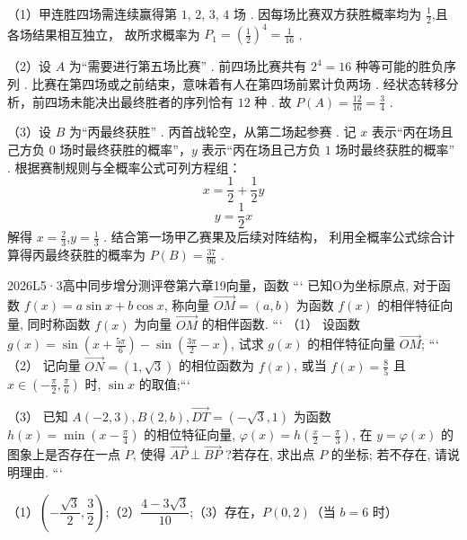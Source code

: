 \documentclass[12pt,UTF-8,a4paper]{ctexart}
\numberwithin{figure}{section}
\theoremstyle{mystyle}
\theoremstyle{mystylekaishu}
\theoremstyle{mystyle}
\numberwithin{xiti}{section}
\begin{document}
\begin{solutions}
（1）甲连胜四场需连续赢得第 $1$, $2$, $3$, $4$ 场 .
因每场比赛双方获胜概率均为 $\displaystyle \frac{1}{2}$,且各场结果相互独立，
故所求概率为 $P_1 = \left(\displaystyle \frac{1}{2}\right)^4 = \displaystyle \frac{1}{16}$ .

（2）设 $A$ 为“需要进行第五场比赛” .
前四场比赛共有 $2^4 = 16$ 种等可能的胜负序列 .
比赛在第四场或之前结束，意味着有人在第四场前累计负两场 .
经状态转移分析，前四场未能决出最终胜者的序列恰有 $12$ 种 .
故 $P(A) = \displaystyle \frac{12}{16} = \displaystyle \frac{3}{4}$ .

（3）设 $B$ 为“丙最终获胜” .
丙首战轮空，从第二场起参赛 .
记 $x$ 表示“丙在场且己方负 $0$ 场时最终获胜的概率”，$y$ 表示“丙在场且己方负 $1$ 场时最终获胜的概率” .
根据赛制规则与全概率公式可列方程组：
$$
x = \displaystyle \frac{1}{2} + \displaystyle \frac{1}{2} y
$$
$$
y = \displaystyle \frac{1}{2} x
$$
解得 $x = \displaystyle \frac{2}{3}$,$y = \displaystyle \frac{1}{3}$ .
结合第一场甲乙赛果及后续对阵结构，
利用全概率公式综合计算得丙最终获胜的概率为 $P(B) = \displaystyle \frac{37}{96}$ .
\end{solutions}


\begin{problem}{2026}{L}{5·3高中同步增分测评卷第六章}{19}{向量，函数}
```
已知O为坐标原点, 对于函数 $f(x)=a \sin x+b \cos x$, 称向量 $\overrightarrow{O M}=(a, b)$ 为函数 $f(x)$ 的相伴特征向量, 同时称函数 $f(x)$ 为向量 $\overrightarrow{O M}$ 的相伴函数.
```
（1） 设函数 $g(x)=\sin \left(x+\frac{5 \pi}{6}\right)-\sin \left(\frac{3 \pi}{2}-x\right)$, 试求 $g(x)$ 的相伴特征向量 $\overrightarrow{O M}$;
```
（2） 记向量 $\overrightarrow{O N}=(1, \sqrt{3})$ 的相位函数为 $f(x)$, 或当 $f(x)=\frac{8}{5}$ 且 $x \in\left(-\frac{\pi}{2}, \frac{\pi}{6}\right)$ 时, $\sin x$ 的取值;```

（3） 已知 $A(-2,3), B(2, b), \overrightarrow{D T}=(-\sqrt{3}, 1)$ 为函数 $h(x)=\min \left(x-\frac{\pi}{4}\right)$ 的相位特征向量, $\varphi(x)=h\left(\frac{x}{2}-\frac{\pi}{3}\right)$, 在 $y=\varphi(x)$ 的图象上是否存在一点 $P$, 使得 $\overrightarrow{A P} \perp \overrightarrow{B P}$ ?若存在, 求出点 $P$ 的坐标; 若不存在, 请说明理由.
```
\end{problem}

\begin{answer}
（1）$\boxed{\left(-\dfrac{\sqrt{3}}{2}, \dfrac{3}{2}\right)}$;（2）$\boxed{\dfrac{4-3\sqrt{3}}{10}}$;（3）存在，$\boxed{P(0,2)}$（当 $b=6$ 时）
\end{answer}
\end{document}
